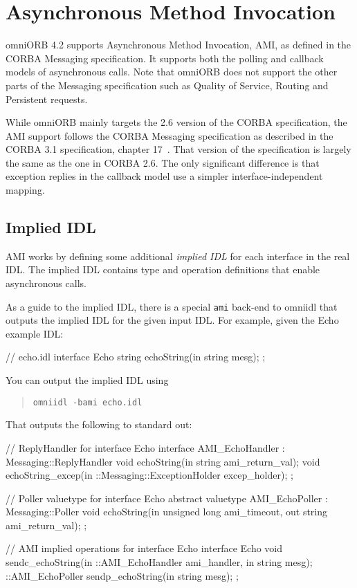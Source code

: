 \documentclass[11pt,twoside,a4paper]{book}
\newcommand{\cmdline}[1]{\texttt{#1}}
\newcommand{\term}[1]{\textit{#1}}
\begin{document}
\chapter{Asynchronous Method Invocation}
\label{chap:ami}

omniORB 4.2 supports Asynchronous Method Invocation, AMI, as defined
in the CORBA Messaging specification. It supports both the polling and
callback models of asynchronous calls. Note that omniORB does not
support the other parts of the Messaging specification such as Quality
of Service, Routing and Persistent requests.

While omniORB mainly targets the 2.6 version of the CORBA
specification, the AMI support follows the CORBA Messaging
specification as described in the CORBA 3.1 specification, chapter
17~\cite{corba31-spec}. That version of the specification is largely
the same as the one in CORBA 2.6. The only significant difference is
that exception replies in the callback model use a simpler
interface-independent mapping.

\section{Implied IDL}

AMI works by defining some additional \term{implied IDL} for each
interface in the real IDL. The implied IDL contains type and
operation definitions that enable asynchronous calls.

As a guide to the implied IDL, there is a special \cmdline{ami}
back-end to omniidl that outputs the implied IDL for the given input
IDL. For example, given the Echo example IDL:

\begin{idllisting}
// echo.idl
interface Echo {
  string echoString(in string mesg);
};
\end{idllisting}

\noindent You can output the implied IDL using

\begin{quote}
\cmdline{omniidl -bami echo.idl}
\end{quote}

\noindent That outputs the following to standard out:

\begin{idllisting}
// ReplyHandler for interface Echo
interface AMI_EchoHandler : Messaging::ReplyHandler {
  void echoString(in string ami_return_val);
  void echoString_excep(in ::Messaging::ExceptionHolder excep_holder);
};

// Poller valuetype for interface Echo
abstract valuetype AMI_EchoPoller : Messaging::Poller {
  void echoString(in unsigned long ami_timeout, out string ami_return_val);
};

// AMI implied operations for interface Echo
interface Echo {
  void sendc_echoString(in ::AMI_EchoHandler ami_handler, in string mesg);
  ::AMI_EchoPoller sendp_echoString(in string mesg);
};
\end{idllisting}
\end{document}
